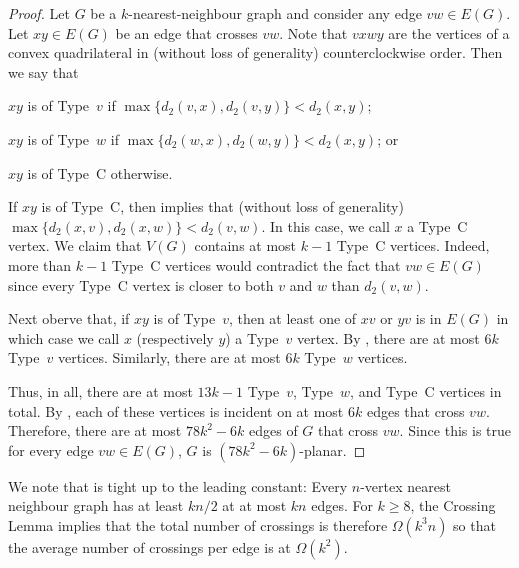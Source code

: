 \documentclass{patmorin}
\begin{document}
\begin{proof}
  Let $G$ be a $k$-nearest-neighbour graph and consider any edge $vw\in E(G)$.
  Let $xy\in E(G)$ be an edge that crosses $vw$.  Note that $vxwy$ are the vertices of a convex quadrilateral in (without loss of generality) counterclockwise order. Then we say that 
  \begin{compactenum}
    \item $xy$ is of Type~$v$ if $\max\{d_2(v,x), d_2(v,y)\}< d_2(x,y)$;
    \item $xy$ is of Type~$w$ if $\max\{d_2(w,x), d_2(w,y)\}< d_2(x,y)$; or
    \item $xy$ is of Type~C otherwise.
  \end{compactenum}
  If $xy$ is of Type~C, then  implies that (without loss of generality) $\max\{d_2(x,v),d_2(x,w)\} < d_2(v,w)$.  In this case, we call $x$ a Type~C vertex.  We claim that $V(G)$ contains at most $k-1$ Type~C vertices.  Indeed, more than $k-1$ Type~C vertices would contradict the fact that $vw\in E(G)$ since every Type~C vertex is closer to both $v$ and $w$ than $d_2(v,w)$.
  
  Next oberve that, if $xy$ is of Type~$v$, then at least one of $xv$ or $yv$ is in $E(G)$ in which case we call $x$ (respectively $y$) a Type~$v$ vertex.  By , there are at most $6k$ Type~$v$ vertices.  Similarly, there are at most $6k$ Type~$w$ vertices.
  
  Thus, in all, there are at most $13k-1$ Type~$v$, Type~$w$, and Type~C vertices in total. By , each of these vertices is incident on at most $6k$ edges that cross $vw$. Therefore, there are at most $78k^2-6k$ edges of $G$ that cross $vw$.  Since this is true for every edge $vw\in E(G)$, $G$ is $(78k^2-6k)$-planar.
\end{proof}

We note that  is tight up to the leading constant:  Every $n$-vertex nearest neighbour graph has at least $kn/2$ at at most $kn$ edges.  For $k\ge 8$, the Crossing Lemma \cite{ajtai.chvatal.ea:crossing-free,leighton:complexity} implies that the total number of crossings is therefore $\Omega(k^3n)$ so that the average number of crossings per edge is at $\Omega(k^2)$.
\end{document}
